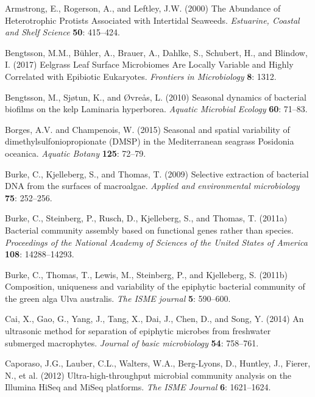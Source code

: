 \documentclass[12pt,]{article}
\begin{document}
\leavevmode\hypertarget{ref-Armstrong2000}{}%
Armstrong, E., Rogerson, A., and Leftley, J.W. (2000) The Abundance of
Heterotrophic Protists Associated with Intertidal Seaweeds.
\emph{Estuarine, Coastal and Shelf Science} \textbf{50}: 415--424.

\leavevmode\hypertarget{ref-Bengtsson2017}{}%
Bengtsson, M.M., Bühler, A., Brauer, A., Dahlke, S., Schubert, H., and
Blindow, I. (2017) Eelgrass Leaf Surface Microbiomes Are Locally
Variable and Highly Correlated with Epibiotic Eukaryotes.
\emph{Frontiers in Microbiology} \textbf{8}: 1312.

\leavevmode\hypertarget{ref-Bengtsson2010}{}%
Bengtsson, M., Sjøtun, K., and Øvreås, L. (2010) Seasonal dynamics of
bacterial biofilms on the kelp Laminaria hyperborea. \emph{Aquatic
Microbial Ecology} \textbf{60}: 71--83.

\leavevmode\hypertarget{ref-Borges2015}{}%
Borges, A.V. and Champenois, W. (2015) Seasonal and spatial variability
of dimethylsulfoniopropionate (DMSP) in the Mediterranean seagrass
Posidonia oceanica. \emph{Aquatic Botany} \textbf{125}: 72--79.

\leavevmode\hypertarget{ref-Burke2009}{}%
Burke, C., Kjelleberg, S., and Thomas, T. (2009) Selective extraction of
bacterial DNA from the surfaces of macroalgae. \emph{Applied and
environmental microbiology} \textbf{75}: 252--256.

\leavevmode\hypertarget{ref-Burke2011a}{}%
Burke, C., Steinberg, P., Rusch, D., Kjelleberg, S., and Thomas, T.
(2011a) Bacterial community assembly based on functional genes rather
than species. \emph{Proceedings of the National Academy of Sciences of
the United States of America} \textbf{108}: 14288--14293.

\leavevmode\hypertarget{ref-Burke2011b}{}%
Burke, C., Thomas, T., Lewis, M., Steinberg, P., and Kjelleberg, S.
(2011b) Composition, uniqueness and variability of the epiphytic
bacterial community of the green alga Ulva australis. \emph{The ISME
journal} \textbf{5}: 590--600.

\leavevmode\hypertarget{ref-Cai2014}{}%
Cai, X., Gao, G., Yang, J., Tang, X., Dai, J., Chen, D., and Song, Y.
(2014) An ultrasonic method for separation of epiphytic microbes from
freshwater submerged macrophytes. \emph{Journal of basic microbiology}
\textbf{54}: 758--761.

\leavevmode\hypertarget{ref-Caporaso2012}{}%
Caporaso, J.G., Lauber, C.L., Walters, W.A., Berg-Lyons, D., Huntley,
J., Fierer, N., et al. (2012) Ultra-high-throughput microbial community
analysis on the Illumina HiSeq and MiSeq platforms. \emph{The ISME
Journal} \textbf{6}: 1621--1624.
\end{document}
